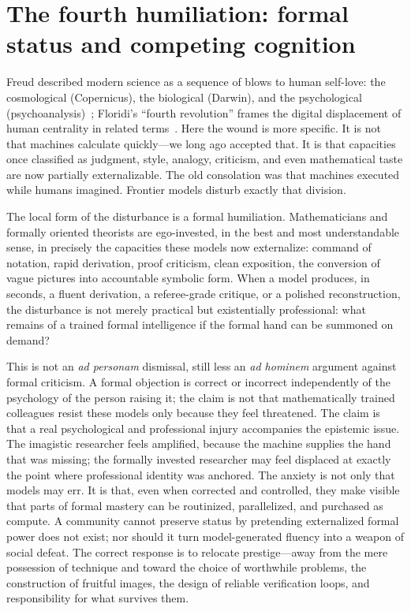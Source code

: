 \documentclass[
  aps,
  reprint,
  superscriptaddress,
  floatfix,
  nofootinbib,
  longbibliography
]{revtex4-2}
\begin{document}
\section{The fourth humiliation: formal status and competing cognition}
\label{sec:humiliation}

Freud described modern science as a sequence of blows to human self-love: the
cosmological (Copernicus), the biological (Darwin), and the psychological
(psychoanalysis)~\cite{freud1917}; Floridi's ``fourth revolution'' frames the
digital displacement of human centrality in related terms~\cite{floridi2014}.
Here the wound is more specific. It is not that machines calculate quickly---we
long ago accepted that. It is that capacities once classified as judgment, style,
analogy, criticism, and even mathematical taste are now partially externalizable.
The old consolation was that machines executed while humans imagined. Frontier
models disturb exactly that division.

The local form of the disturbance is a formal humiliation. Mathematicians and
formally oriented theorists are ego-invested, in the best and most
understandable sense, in precisely the capacities these models now externalize:
command of notation, rapid derivation, proof criticism, clean exposition, the
conversion of vague pictures into accountable symbolic form. When a model
produces, in seconds, a fluent derivation, a referee-grade critique, or a
polished reconstruction, the disturbance is not merely practical but
existentially professional: what remains of a trained formal intelligence if the
formal hand can be summoned on demand?

This is not an \emph{ad personam} dismissal, still less an \emph{ad hominem}
argument against formal criticism. A formal objection is correct or incorrect
independently of the psychology of the person raising it; the claim is not that
mathematically trained colleagues resist these models only because they feel
threatened. The claim is that a real psychological and professional injury
accompanies the epistemic issue. The imagistic researcher feels amplified,
because the machine supplies the hand that was missing; the formally invested
researcher may feel displaced at exactly the point where professional identity
was anchored. The anxiety is not only that models may err. It is that, even when
corrected and controlled, they make visible that parts of formal mastery can be
routinized, parallelized, and purchased as compute. A community cannot preserve
status by pretending externalized formal power does not exist; nor should it turn
model-generated fluency into a weapon of social defeat. The correct response is
to relocate prestige---away from the mere possession of technique and toward the
choice of worthwhile problems, the construction of fruitful images, the design of
reliable verification loops, and responsibility for what survives them.
\end{document}

